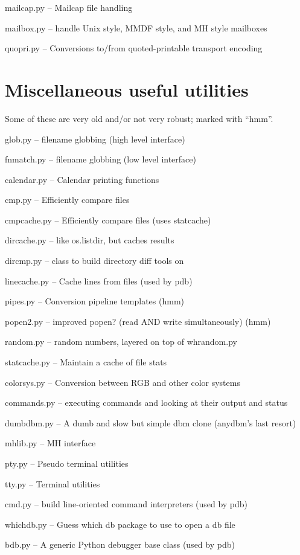 mailcap.py -- Mailcap file handling

mailbox.py -- handle Unix style, MMDF style, and MH style mailboxes

quopri.py -- Conversions to/from quoted-printable transport encoding


\section{Miscellaneous useful utilities}

Some of these are very old and/or not very robust; marked with ``hmm''.

glob.py -- filename globbing (high level interface)

fnmatch.py -- filename globbing (low level interface)

calendar.py -- Calendar printing functions

cmp.py -- Efficiently compare files

cmpcache.py -- Efficiently compare files (uses statcache)

dircache.py -- like os.listdir, but caches results

dircmp.py -- class to build directory diff tools on

linecache.py -- Cache lines from files (used by pdb)

pipes.py -- Conversion pipeline templates (hmm)

popen2.py -- improved popen? (read AND write simultaneously) (hmm)

random.py -- random numbers, layered on top of whrandom.py

statcache.py -- Maintain a cache of file stats

colorsys.py -- Conversion between RGB and other color systems

commands.py -- executing commands and looking at their output and
status

dumbdbm.py -- A dumb and slow but simple dbm clone (anydbm's last
resort)

mhlib.py -- MH interface

pty.py -- Pseudo terminal utilities

tty.py -- Terminal utilities

cmd.py -- build line-oriented command interpreters (used by pdb)

whichdb.py -- Guess which db package to use to open a db file

bdb.py -- A generic Python debugger base class (used by pdb)

